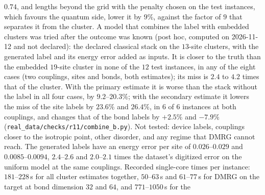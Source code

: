 \documentclass[aps,prx,onecolumn,10pt,nofootinbib,longbibliography,floatfix]{revtex4-2}
\theoremstyle{remark}
\begin{document}
$0.74$, and lengths beyond the grid with the penalty chosen on the test instances, which favours the quantum side, %
lower it by $9\%$, against the factor of $9$ that separates it from the cluster. %
A model that combines the label with embedded clusters was tried after the outcome was known (post hoc, computed on
2026-11-12 and not declared): the declared classical stack on the $13$-site clusters, with the generated label and %
its energy error added as inputs. It is closer to the truth than the embedded $19$-site cluster in none of the $12$ test %
instances, in any of the eight cases (two couplings, sites and bonds, both estimates); its miss is $2.4$ to $4.2$ times that %
of the cluster. With the primary estimate it is worse than the stack without the label in all four cases, by
$9.2$--$20.3\%$; with the secondary estimate it lowers the miss of the site labels by $23.6\%$ and $26.4\%$, in %
$6$ of $6$ instances at both couplings, and changes that of the bond labels by $+2.5\%$ and $-7.9\%$ %
(\texttt{real\_data/checks/r11/combine\_b.py}). Not tested: device labels, couplings closer to the isotropic point, other
disorder, and any regime that DMRG cannot reach. The generated labels have an energy error per site of $0.026$--$0.029$ %
and $0.0085$--$0.0094$, $2.4$--$2.6$ and $2.0$--$2.1$ times the dataset's digitized error on the uniform model at the %
same couplings. Recorded single-core times per instance: $181$--$228$\,s for all cluster estimates together, %
$50$--$63$\,s and $61$--$77$\,s for DMRG on the target at bond dimension $32$ and $64$, and $771$--$1050$\,s for the %
\end{document}
